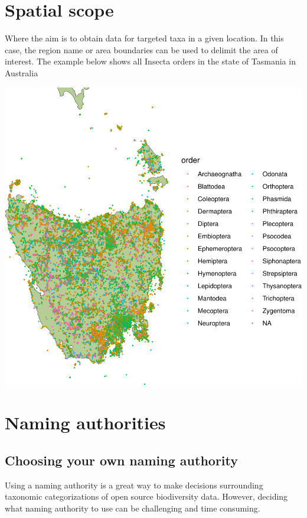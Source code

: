 \documentclass[
  letterpaper,
  DIV=11,
  numbers=noendperiod,
  oneside]{scrreprt}
\begin{document}
\hypertarget{spatial-scope}{%
\section{Spatial scope}\label{spatial-scope}}

Where the aim is to obtain data for targeted taxa in a given location.
In this case, the region name or area boundaries can be used to delimit
the area of interest. The example below shows all Insecta orders in the
state of Tasmania in Australia

\includegraphics{scope_files/figure-pdf/unnamed-chunk-2-1.pdf}

\hypertarget{naming-authorities}{%
\section{Naming authorities}\label{naming-authorities}}

\hypertarget{choosing-your-own-naming-authority}{%
\subsection{Choosing your own naming
authority}\label{choosing-your-own-naming-authority}}

Using a naming authority is a great way to make decisions surrounding
taxonomic categorizations of open source biodiversity data. However,
deciding what naming authority to use can be challenging and time
consuming.
\end{document}

